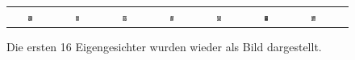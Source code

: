 \begin{figure}[ht]
\begin{tabular}{cccccccc}
		\includegraphics[width=0.1\textwidth]{images/eigenfaces/eigenface09} & \includegraphics[width=0.1\textwidth]{images/eigenfaces/eigenface10} &
		\includegraphics[width=0.1\textwidth]{images/eigenfaces/eigenface11} & \includegraphics[width=0.1\textwidth]{images/eigenfaces/eigenface12} &
		\includegraphics[width=0.1\textwidth]{images/eigenfaces/eigenface13} & \includegraphics[width=0.1\textwidth]{images/eigenfaces/eigenface14} &
		\includegraphics[width=0.1\textwidth]{images/eigenfaces/eigenface15} \\
	\end{tabular}
	\caption{Die ersten 16 Eigengesichter wurden wieder als Bild dargestellt.}
	\label{fig:eigenfaces}
\end{figure}

